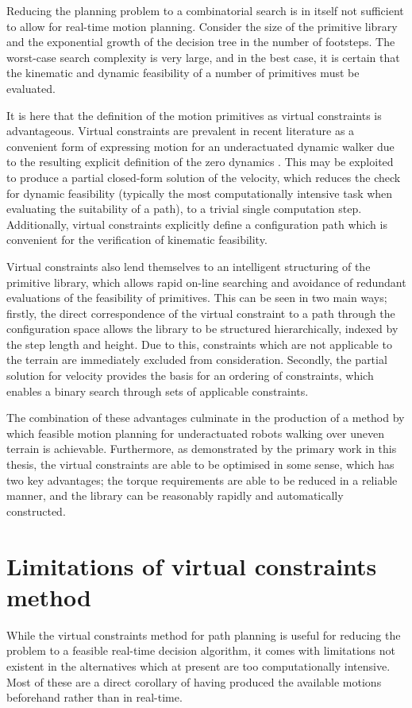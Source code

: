 Reducing the planning problem to a combinatorial search is in itself not sufficient to allow for real-time motion planning. Consider the size of the primitive library and the exponential growth of the decision tree in the number of footsteps. The worst-case search complexity is very large, and in the best case, it is certain that the kinematic and dynamic feasibility of a number of primitives must be evaluated.

It is here that the definition of the motion primitives as virtual constraints is advantageous. Virtual constraints are prevalent in recent literature as a convenient form of expressing motion for an underactuated dynamic walker due to the resulting explicit definition of the zero dynamics \cite{westervelt2003hybrid, sreenath2011compliant, martin2014design}. This may be exploited to produce a partial closed-form solution of the velocity, which reduces the check for dynamic feasibility (typically the most computationally intensive task when evaluating the suitability of a path), to a trivial single computation step. Additionally, virtual constraints explicitly define a configuration path which is convenient for the verification of kinematic feasibility.

Virtual constraints also lend themselves to an intelligent structuring of the primitive library, which allows rapid on-line searching and avoidance of redundant evaluations of the feasibility of primitives. This can be seen in two main ways; firstly, the direct correspondence of the virtual constraint to a path through the configuration space allows the library to be structured hierarchically, indexed by the step length and height. Due to this, constraints which are not applicable to the terrain are immediately excluded from consideration. Secondly, the partial solution for velocity provides the basis for an ordering of constraints, which enables a binary search through sets of applicable constraints. 

The combination of these advantages culminate in the production of a method by which feasible motion planning for underactuated robots walking over uneven terrain is achievable. Furthermore, as demonstrated by the primary work in this thesis, the virtual constraints are able to be optimised in some sense, which has two key advantages; the torque requirements are able to be reduced in a reliable manner, and the library can be reasonably rapidly and automatically constructed.

\section{Limitations of virtual constraints method}
While the virtual constraints method for path planning is useful for reducing the problem to a feasible real-time decision algorithm, it comes with limitations not existent in the alternatives which at present are too computationally intensive. Most of these are a direct corollary of having produced the available motions beforehand rather than in real-time.

